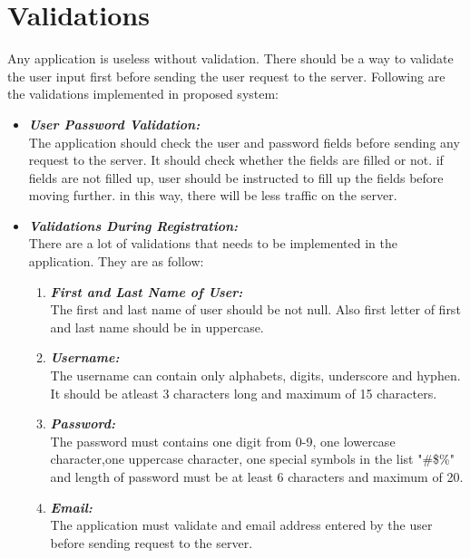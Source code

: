\pagebreak
\section{Validations}
Any application is useless without validation. There should be a way to validate the user input first before sending the user request to the server. Following are the validations implemented in proposed system:
\begin{itemize}
\item \textbf{\emph{User Password Validation:}}\\
The application should check the user and password fields before sending any request to the server. It should check whether the fields are
filled or not. if fields are not filled up, user should be instructed to fill up the fields before moving further. in this way, there will
be less traffic on the server.

\item \textbf{\emph{Validations During Registration:}}\\
There are a lot of validations that needs to be implemented in the application. They are as follow:
\begin{enumerate}

\item \textbf{\emph{First and Last Name of User:}}\\
The first and last name of user should be not null. Also first letter of first and last name should be in uppercase.

\item \textbf{\emph{Username:}}\\
The username can contain only alphabets, digits, underscore and hyphen. It should be atleast 3 characters long and maximum of 15 characters.

\item \textbf{\emph{Password:}}\\
The password must contains one digit from 0-9, one lowercase character,one uppercase character, one special symbols in the list "\@\#\$\%" and length of password must be at least 6 characters and maximum of 20.

\item \textbf{\emph{Email:}}\\
The application must validate and email address entered by the user before sending request to the server.


\end{enumerate}
\end{itemize}

